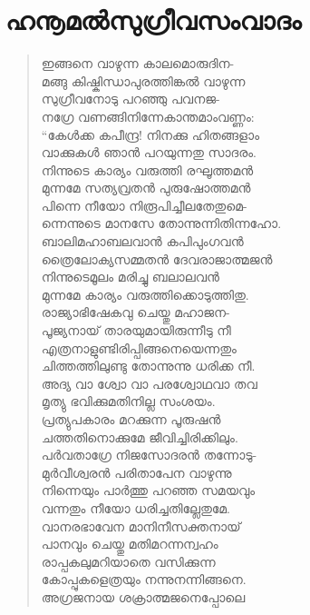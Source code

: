 
\section{ഹനൂമല്‍സുഗ്രീവസംവാദം}

\begin{verse}
ഇങ്ങനെ വാഴുന്ന കാലമൊരുദിന-\\
മങ്ങു കിഷ്കിന്ധാപുരത്തിങ്കല്‍ വാഴുന്ന\\
സുഗ്രീവനോടു പറഞ്ഞു പവനജ-\\
നഗ്രേ വണങ്ങിനിന്നേകാന്തമാംവണ്ണം:\\
“കേള്‍ക്ക കപീന്ദ്ര! നിനക്കു ഹിതങ്ങളാം\\
വാക്കുകള്‍ ഞാന്‍ പറയുന്നതു സാദരം.\\
നിന്നുടെ കാര്യം വരുത്തി രഘൂത്തമന്‍\\
മുന്നമേ സത്യവ്രതന്‍ പുരുഷോത്തമന്‍\\
പിന്നെ നീയോ നിരൂപിച്ചീലതേതുമെ-\\
ന്നെന്നുടെ മാനസേ തോന്നുന്നിതിന്നഹോ.\\
ബാലിമഹാബലവാന്‍ കപിപുംഗവന്‍\\
ത്രൈലോക്യസമ്മതന്‍ ദേവരാജാത്മജന്‍\\
നിന്നുടെമൂലം മരിച്ചു ബലാലവന്‍\\
മുന്നമേ കാര്യം വരുത്തിക്കൊടുത്തിതു.\\
രാജ്യാഭിഷേകവു ചെയ്തു മഹാജന-\\
പൂജ്യനായ് താരയുമായിരുന്നീടു നീ\\
എത്രനാളുണ്ടിരിപ്പിങ്ങനെയെന്നതും\\
ചിത്തത്തിലുണ്ടു തോന്നുന്നു ധരിക്ക നീ.\\
അദ്യ വാ ശ്വോ വാ പരശ്വോഥവാ തവ\\
മൃത്യു ഭവിക്കുമതിനില്ല സംശയം.\\
പ്രത്യുപകാരം മറക്കുന്ന പൂരുഷന്‍\\
ചത്തതിനൊക്കുമേ ജീവിച്ചിരിക്കിലും.\\
പര്‍വതാഗ്രേ നിജസോദരന്‍ തന്നോടു-\\
മുര്‍വീശ്വരന്‍ പരിതാപേന വാഴുന്നു\\
നിന്നെയും പാര്‍ത്തു പറഞ്ഞ സമയവും\\
വന്നതും നീയോ ധരിച്ചതില്ലേതുമേ.\\
വാനരഭാവേന മാനിനീസക്തനായ്\\
പാനവും ചെയ്തു മതിമറന്നന്വഹം\\
രാപ്പകലുമറിയാതെ വസിക്കുന്ന\\
കോപ്പുകളെത്രയും നന്നുനന്നിങ്ങനെ.\\
അഗ്രജനായ ശക്രാത്മജനെപ്പോലെ\\

\end{verse}
